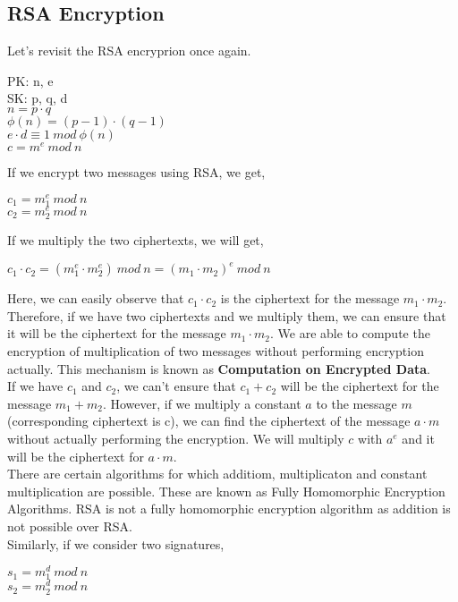 \documentclass[11pt]{article}
\begin{document}
\subsection{RSA Encryption}
Let's revisit the RSA encryprion once again.
\begin{center}
    PK: n, e\\
    SK: p, q, d\\
    $n = p \cdot q$\\
    $\phi(n) = (p-1) \cdot (q - 1)$\\
    $e \cdot d \equiv 1 \ mod \ \phi(n)$\\
    $c = m^e \ mod \ n$
\end{center}
If we encrypt two messages using RSA, we get,
\begin{center}
    $c_1 = m_1^e \ mod \ n$\\
    $c_2 = m_2^e \ mod \ n$
\end{center}
If we multiply the two ciphertexts, we will get,
\begin{center}
    $c_1 \cdot c_2 = (m_1^e \cdot m_2^e) \ mod \ n = {(m_1 \cdot m_2)}^e \ mod \ n$
\end{center}
Here, we can easily observe that $c_1 \cdot c_2$ is the ciphertext for the message $m_1 \cdot m_2$. Therefore, if we have two ciphertexts and we multiply them, we can ensure that it will be the ciphertext for the message $m_1 \cdot m_2$. We are able to compute the encryption of multiplication of two messages without performing encryption actually. This mechanism is known as \textbf{Computation on Encrypted Data}.\\
\newline
If we have $c_1$ and $c_2$, we can't ensure that $c_1 + c_2$ will be the ciphertext for the message $m_1 + m_2$. However, if we multiply a constant $a$ to the message $m$ (corresponding ciphertext is c), we can find the ciphertext of the message $a \cdot m$ without actually performing the encryption. We will multiply $c$ with $a^e$ and it will be the ciphertext for $a\cdot m$.\\
\newline
There are certain algorithms for which additiom, multiplicaton and constant multiplication are possible. These are known as Fully Homomorphic Encryption Algorithms. RSA is not a fully homomorphic encryption algorithm as addition is not possible over RSA.\\
\newline
Similarly, if we consider two signatures,
\begin{center}
    $s_1 = m_1^d \ mod \ n$\\
    $s_2 = m_2^d \ mod \ n$
\end{center}
\end{document}
